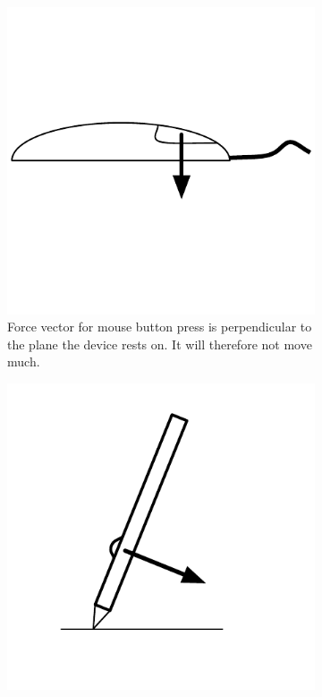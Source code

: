 \begin{figure}
  \centering 
  \begin{subfigure}[b]{6.0cm}
    \centering
    \includegraphics[origin=c, width=\textwidth]{img/button-force-mouse.pdf} 
    \caption{Force vector for mouse button press is perpendicular to
      the plane the device rests on. It will therefore not move much.}
    \label{fig:button-force-mouse} 
  \end{subfigure}
  \hspace{0.5cm} 
  \begin{subfigure}[b]{6.0cm}
    \centering
    \includegraphics[origin=c, width=\textwidth]{img/button-force-pen.pdf} 

\end{subfigure}
\end{figure}
